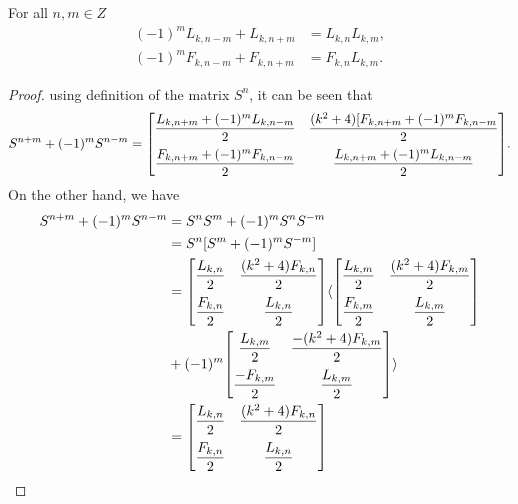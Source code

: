 \begin{lemma}For all $n,m\in Z$\label{3-l-4}
\begin{align}
(-1)^mL_{k,n-m}+L_{k,n+m}&=L_{k,n}L_{k,m},\\
(-1)^mF_{k,n-m}+F_{k,n+m}&=F_{k,n}L_{k,m}.
\end{align}
\end{lemma}
\begin{proof}
using definition of the matrix $S^n$, it can be seen that 
$$S^{n+m}+(-1)^mS^{n-m}={
 \begin{bmatrix}{}
    \dfrac{L_{k,n+m}+(-1)^mL_{k,n-m}}{2} & \dfrac{(k^2+4)[F_{k,n+m}+(-1)^mF_{k,n-m}}{2}\vspace{.2cm} \\
    \dfrac{F_{k,n+m}+(-1)^mF_{k,n-m}}{2} & \dfrac{L_{k,n+m}+(-1)^mL_{k,n-m}}{2} \\
	\end{bmatrix}
	}.$$
	On the other hand, we have
	\begin{align*}
	S^{n+m}+(-1)^mS^{n-m}&=S^nS^m+(-1)^mS^nS^{-m}\\
											 &=S^n[S^m+(-1)^mS^{-m}]\\
											 &={
 \begin{bmatrix}{}
    \dfrac{L_{k,n}}{2} & \dfrac{(k^2+4)F_{k,n}}{2} \vspace{.2cm}\\
    \dfrac{F_{k,n}}{2} & \dfrac{L_{k,n}}{2} \\
	\end{bmatrix}
	}\langle{
 \begin{bmatrix}{}
    \dfrac{L_{k,m}}{2} & \dfrac{(k^2+4)F_{k,m}}{2}\vspace{.2cm} \\
    \dfrac{F_{k,m}}{2} & \dfrac{L_{k,m}}{2} \\
	\end{bmatrix}
	}\\&+(-1)^m{
 \begin{bmatrix}{}
    \dfrac{L_{k,m}}{2} & \dfrac{-(k^2+4)F_{k,m}}{2} \vspace{.2cm}\\
    \dfrac{-F_{k,m}}{2} & \dfrac{L_{k,m}}{2} \\
	\end{bmatrix}
	}\rangle\\			
					&={
 \begin{bmatrix}{}
    \dfrac{L_{k,n}}{2} & \dfrac{(k^2+4)F_{k,n}}{2}\vspace{.2cm} \\
    \dfrac{F_{k,n}}{2} & \dfrac{L_{k,n}}{2} \\

\end{bmatrix}}
\end{align*}
\end{proof}
